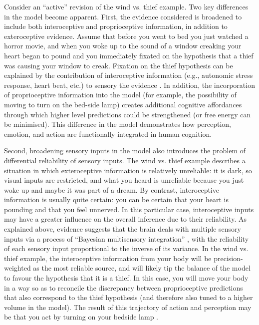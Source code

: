 \begin{CJK}{UTF8}{gbsn}
Consider an ``active'' revision of the wind vs. thief example.  Two key differences in the model become apparent.  First, the evidence considered is broadened to include both interoceptive and proprioceptive information, in addition to exteroceptive evidence.  Assume that before you went to bed you just watched a horror movie, and when you woke up to the sound of a window creaking your heart began to pound and you immediately fixated on the hypothesis that a thief was causing your window to creak.  Fixation on the thief hypothesis can be explained by the contribution of interoceptive information (e.g., autonomic stress response, heart beat, etc.) to sensory the evidence \citep{Pezzulo2014}.  In addition, the incorporation of proprioceptive information into the model (for example, the possibility of moving to turn on the bed-side lamp) creates additional cognitive affordances through which higher level predictions could be strengthened (or free energy can be minimised).  This difference in the model demonstrates how perception, emotion, and action are functionally integrated in human cognition.

Second, broadening sensory inputs in the model also introduces the problem of differential reliability of sensory inputs.  The wind vs. thief example describes a situation in which exteroceptive information is relatively unreliable: it is dark, so visual inputs are restricted, and what you heard is unreliable because you just woke up and maybe it was part of a dream.  By contrast, interoceptive information is usually quite certain: you can be certain that your heart is pounding and that you feel unnerved.  In this particular case, interoceptive inputs may have a greater influence on the overall inference due to their reliability.  As explained above, evidence suggests that the brain deals with multiple sensory inputs via a process of ``Bayesian multisensory integration'' \citep{Ernst2004}, with the reliability of each sensory input proportional to the inverse of its variance.  In the wind vs. thief example, the interoceptive information from your body will be precision-weighted as the most reliable source, and will likely tip the balance of the model to favour the hypothesis that it is a thief.  In this case, you will move your body in a way so as to reconcile the discrepancy between proprioceptive predictions that also correspond to the thief hypothesis (and therefore also tuned to a higher volume in the model).  The result of this trajectory of action and perception may be that you act by turning on your bedside lamp \citep{Pezzulo2014}.


\end{CJK}
